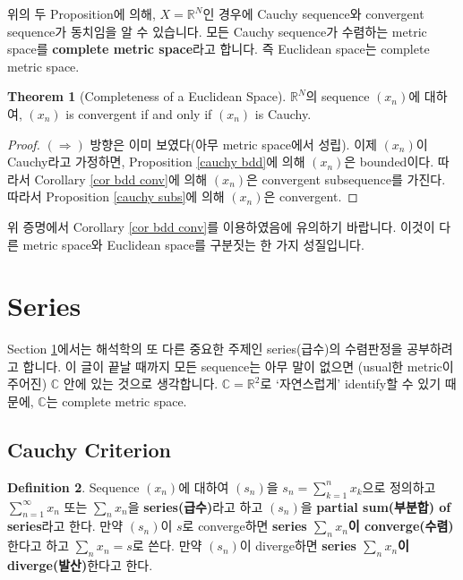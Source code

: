 \documentclass[12pt]{article}
\theoremstyle{definition}
\newtheorem{thm}{Theorem}[section]
\newtheorem{defn}[thm]{Definition}
\def\RR{\mathbb{R}}
\def\CC{\mathbb{C}}
\begin{document}
위의 두 Proposition에 의해, \(X = \RR^N\)인 경우에 Cauchy sequence와 convergent sequence가 동치임을 알 수 있습니다. 모든 Cauchy sequence가 수렴하는 metric space를 \textbf{complete metric space}라고 합니다. 즉 Euclidean space는 complete metric space.

	\begin{thm}[Completeness of a Euclidean Space]
		\(\RR^N\)의 sequence \((x_n)\)에 대하여, \((x_n)\) is convergent if and only if \((x_n)\) is Cauchy.
	\end{thm}
	\begin{proof}
		\((\Rightarrow)\) 방향은 이미 보였다(아무 metric space에서 성립). 이제 \((x_n)\)이 Cauchy라고 가정하면, Proposition \ref{cauchy bdd}에 의해 \((x_n)\)은 bounded이다. 따라서 Corollary \ref{cor bdd conv}에 의해 \((x_n)\)은 convergent subsequence를 가진다. 따라서 Proposition \ref{cauchy subs}에 의해 \((x_n)\)은 convergent.
	\end{proof}

위 증명에서 Corollary \ref{cor bdd conv}를 이용하였음에 유의하기 바랍니다. 이것이 다른 metric space와 Euclidean space를 구분짓는 한 가지 성질입니다.

\newpage

\section{Series} \label{sec series}

Section \ref{sec series}에서는 해석학의 또 다른 중요한 주제인 series(급수)의 수렴판정을 공부하려고 합니다. 이 글이 끝날 때까지 모든 sequence는 아무 말이 없으면 (usual한 metric이 주어진) \(\CC\) 안에 있는 것으로 생각합니다. \(\CC = \RR^2\)로 `자연스럽게' identify할 수 있기 때문에, \(\CC\)는 complete metric space.

\subsection{Cauchy Criterion}

	\begin{defn}
		Sequence \((x_n)\)에 대하여 \((s_n)\)을 \(s_n = \sum_{k=1}^n x_k\)으로 정의하고 \(\sum_{n=1}^\infty x_n\) 또는 \(\sum_n x_n\)을 \textbf{series(급수)}라고 하고 \((s_n)\)을 \textbf{partial sum(부분합) of series}라고 한다. 만약 \((s_n)\)이 \(s\)로 converge하면 \textbf{series \(\sum_n x_n\)이 converge(수렴)}한다고 하고 \(\sum_n x_n = s\)로 쓴다. 만약 \((s_n)\)이 diverge하면 \textbf{series \(\sum_n x_n\)이 diverge(발산)}한다고 한다.
	\end{defn}
\end{document}
